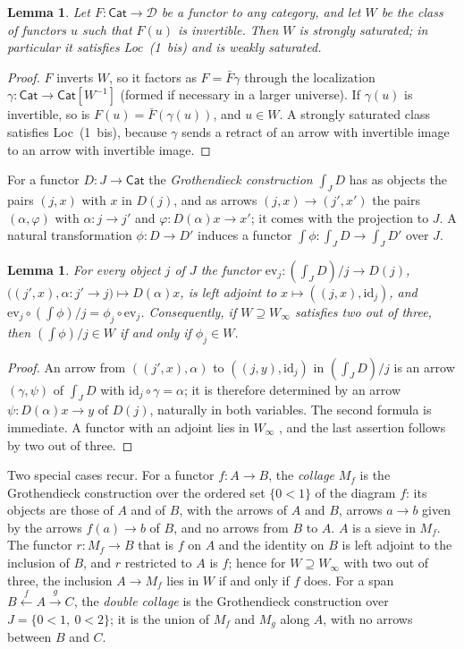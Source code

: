 \documentclass[11pt,a4paper]{article}
\newtheorem{lemma}[theorem]{Lemma}
\theoremstyle{definition}
\newcommand{\Cat}{\mathsf{Cat}}
\newcommand{\Winf}{W_{\infty}}
\newcommand{\id}{\mathrm{id}}
\begin{document}
\begin{lemma}\label{lem:inverse-image}
Let $F\colon\Cat\to\mathcal D$ be a functor to any category, and let $W$ be the class of
functors $u$ such that $F(u)$ is invertible. Then $W$ is strongly saturated; in particular it
satisfies Loc~\textup{(1~bis)} and is weakly saturated.
\end{lemma}

\begin{proof}
$F$ inverts $W$, so it factors as $F=\bar F\gamma$ through the localization
$\gamma\colon\Cat\to\Cat[W^{-1}]$ (formed if necessary in a larger universe). If $\gamma(u)$
is invertible, so is $F(u)=\bar F(\gamma(u))$, and $u\in W$. A strongly saturated class
satisfies Loc~(1~bis), because $\gamma$ sends a retract of an arrow with invertible image to
an arrow with invertible image.
\end{proof}

For a functor $D\colon J\to\Cat$ the \emph{Grothendieck construction} $\int_JD$ has as
objects the pairs $(j,x)$ with $x$ in $D(j)$, and as arrows $(j,x)\to(j',x')$ the pairs
$(\alpha,\varphi)$ with $\alpha\colon j\to j'$ and $\varphi\colon D(\alpha)x\to x'$; it comes
with the projection to $J$. A natural transformation $\phi\colon D\to D'$ induces a functor
$\int\phi\colon\int_JD\to\int_JD'$ over $J$.

\begin{lemma}\label{lem:grothendieck}
For every object $j$ of $J$ the functor
$\mathrm{ev}_j\colon(\int_JD)/j\to D(j)$, $\bigl((j',x),\alpha\colon j'\to j\bigr)\mapsto
D(\alpha)x$, is left adjoint to $x\mapsto((j,x),\id_j)$, and $\mathrm{ev}_j\circ(\int\phi)/j=
\phi_j\circ\mathrm{ev}_j$. Consequently, if $W\supseteq\Winf$ satisfies two out of three, then
$(\int\phi)/j\in W$ if and only if $\phi_j\in W$.
\end{lemma}

\begin{proof}
An arrow from $((j',x),\alpha)$ to $((j,y),\id_j)$ in $(\int_JD)/j$ is an arrow
$(\gamma,\psi)$ of $\int_JD$ with $\id_j\circ\gamma=\alpha$; it is therefore determined by an
arrow $\psi\colon D(\alpha)x\to y$ of $D(j)$, naturally in both variables. The second
formula is immediate. A functor with an adjoint lies in $\Winf$ \cite[\S1, Corollary~1 of Proposition~2]{Qui73}, and
the last assertion follows by two out of three.
\end{proof}

Two special cases recur. For a functor $f\colon A\to B$, the \emph{collage} $M_f$ is the
Grothendieck construction over the ordered set $\{0<1\}$ of the diagram $f$: its objects are
those of $A$ and of $B$, with the arrows of $A$ and $B$, arrows $a\to b$ given by the arrows
$f(a)\to b$ of $B$, and no arrows from $B$ to $A$. $A$ is a sieve in $M_f$. The functor
$r\colon M_f\to B$ that is $f$ on $A$ and the identity on $B$ is left adjoint to the inclusion
of $B$, and $r$ restricted to $A$ is $f$; hence for $W\supseteq\Winf$ with two out of three,
the inclusion $A\to M_f$ lies in $W$ if and only if $f$ does. For a span
$B\xleftarrow{f}A\xrightarrow{g}C$, the \emph{double collage} is the Grothendieck construction
over $J=\{0<1,\ 0<2\}$; it is the union of $M_f$ and $M_g$ along $A$, with no arrows between
$B$ and $C$.
\end{document}

